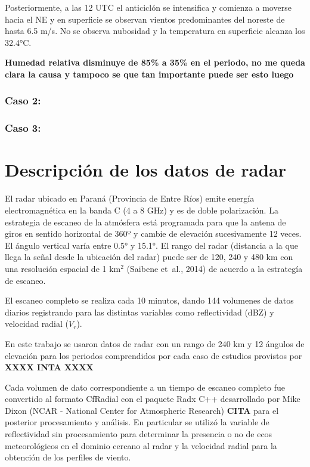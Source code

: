\documentclass[12pt,spanish,oneside]{book}
\begin{document}
Posteriormente, a las 12 UTC el anticiclón se intensifica y comienza a
moverse hacia el NE y en superficie se observan vientos predominantes
del noreste de hasta 6.5 m/s. No se observa nubosidad y la temperatura
en superficie alcanza los 32.4°C.

\textbf{Humedad relativa disminuye de 85\% a 35\% en el periodo, no me
queda clara la causa y tampoco se que tan importante puede ser esto
luego}

\subsubsection{Caso 2:}\label{caso-2}

\subsubsection{Caso 3:}\label{caso-3}

\section{Descripción de los datos de
radar}\label{descripcion-de-los-datos-de-radar}

El radar ubicado en Paraná (Provincia de Entre Ríos) emite energía
electromagnética en la banda C (4 a 8 GHz) y es de doble polarización.
La estrategia de escaneo de la atmósfera está programada para que la
antena de giros en sentido horizontal de 360º y cambie de elevación
sucesivamente 12 veces. El ángulo vertical varía entre 0.5° y 15.1°. El
rango del radar (distancia a la que llega la señal desde la ubicación
del radar) puede ser de 120, 240 y 480 km con una resolución espacial de
1 \(\mathrm{km^2}\) (Saibene et~al., 2014) de acuerdo a la estrategía de
escaneo.

El escaneo completo se realiza cada 10 minutos, dando 144 volumenes de
datos diarios registrando para las distintas variables como
reflectividad (dBZ) y velocidad radial (\(V_r\)).

En este trabajo se usaron datos de radar con un rango de 240 km y 12
ángulos de elevación para los periodos comprendidos por cada caso de
estudios provistos por \textbf{XXXX INTA XXXX}

Cada volumen de dato correspondiente a un tiempo de escaneo completo fue
convertido al formato CfRadial con el paquete Radx C++ desarrollado por
Mike Dixon (NCAR - National Center for Atmospheric Research)
\textbf{CITA} para el posterior procesamiento y análisis. En particular
se utilizó la variable de reflectividad sin procesamiento para
determinar la presencia o no de ecos meteorológicos en el dominio
cercano al radar y la velocidad radial para la obtención de los perfiles
de viento.
\end{document}
